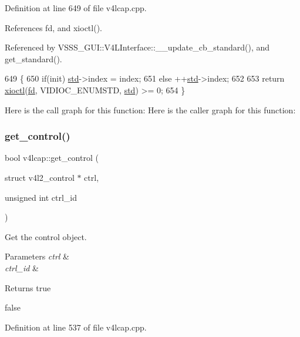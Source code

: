 Definition at line 649 of file v4lcap.\+cpp.



References fd, and xioctl().



Referenced by V\+S\+S\+S\+\_\+\+G\+U\+I\+::\+V4\+L\+Interface\+::\+\_\+\+\_\+update\+\_\+cb\+\_\+standard(), and get\+\_\+standard().


\begin{DoxyCode}
649                                                                                  \{
650     \textcolor{keywordflow}{if}(init) \hyperlink{namespacestd}{std}->index = index;
651     \textcolor{keywordflow}{else} ++\hyperlink{namespacestd}{std}->index;
652 
653     \textcolor{keywordflow}{return} \hyperlink{classv4lcap_ab5aaa5a8c0df17f5ca57e0b5170232cb}{xioctl}(\hyperlink{classv4lcap_a38109593bde997dad13b3a461569573d}{fd}, VIDIOC\_ENUMSTD, \hyperlink{namespacestd}{std}) >= 0;
654 \}
\end{DoxyCode}
Here is the call graph for this function\+:
Here is the caller graph for this function\+:
\mbox{\label{classv4lcap_affd6d918400a56e165d7a3e4fab8bdae}} 
\subsubsection{\texorpdfstring{get\+\_\+control()}{get\_control()}}
{\footnotesize\ttfamily bool v4lcap\+::get\+\_\+control (\begin{DoxyParamCaption}\item[{struct v4l2\+\_\+control $\ast$}]{ctrl,  }\item[{unsigned int}]{ctrl\+\_\+id }\end{DoxyParamCaption})}



Get the control object. 


\begin{DoxyParams}{Parameters}
{\em ctrl} & \\
\hline
{\em ctrl\+\_\+id} & \\
\hline
\end{DoxyParams}
\begin{DoxyReturn}{Returns}
true 

false 
\end{DoxyReturn}


Definition at line 537 of file v4lcap.\+cpp.



